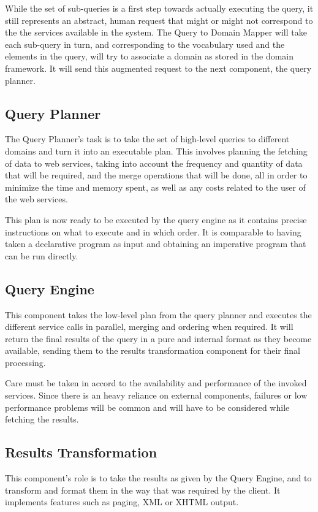 While the set of sub-queries is a first step towards actually executing the query, it still represents an abstract, human request that might or might not correspond to the the services available in the system. The Query to Domain Mapper will take each sub-query in turn, and corresponding to the vocabulary used and the elements in the query, will try to associate a domain as stored in the domain framework. It will send this augmented request to the next component, the query planner.


\subsection{Query Planner} %
\label{sub:query_planner}

The Query Planner's task is to take the set of high-level queries to different domains and turn it into an executable plan. This involves planning the fetching of data to web services, taking into account the frequency and quantity of data that will be required, and the merge operations that will be done, all in order to minimize the time and memory spent, as well as any costs related to the user of the web services.

This plan is now ready to be executed by the query engine as it contains precise instructions on what to execute and in which order. It is comparable to having taken a declarative program as input and obtaining an imperative program that can be run directly.


\subsection{Query Engine} %
\label{sub:query_engine}
This component takes the low-level plan from the query planner and executes the different service calls in parallel, merging and ordering when required. It will return the final results of the query in a pure and internal format as they become available, sending them to the results transformation component for their final processing.

Care must be taken in accord to the availability and performance of the invoked services. Since there is an heavy reliance on external components, failures or low performance problems will be common and will have to be considered while fetching the results.

\subsection{Results Transformation} %
\label{sub:results_transformation}
This component's role is to take the results as given by the Query Engine, and to transform and format them in the way that was required by the client. It implements features such as paging, XML or XHTML output.

